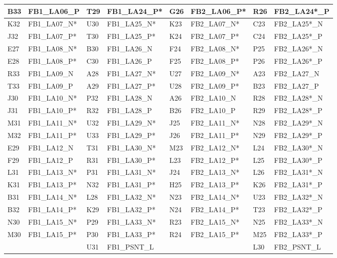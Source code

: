 \documentclass[letterpaper]{article}
\begin{document}
\begin{table}[htp]
\begin{tabular}{|l|l|l|l||l|l|l|l|}
B33 & FB1\_LA06\_P & T29 & FB1\_LA24\_P* & G26 & FB2\_LA06\_P* & R26 & FB2\_LA24*\_P\\ \hline
K32 & FB1\_LA07\_N* & U30 & FB1\_LA25\_N* & K23 & FB2\_LA07\_N* & C23 & FB2\_LA25*\_N\\ \hline
J32 & FB1\_LA07\_P* & T30 & FB1\_LA25\_P* & K24 & FB2\_LA07\_P* & C24 & FB2\_LA25*\_P\\ \hline
E27 & FB1\_LA08\_N* & B30 & FB1\_LA26\_N & F24 & FB2\_LA08\_N* & P25 & FB2\_LA26*\_N\\ \hline
E28 & FB1\_LA08\_P* & C30 & FB1\_LA26\_P & F25 & FB2\_LA08\_P* & P26 & FB2\_LA26*\_P\\ \hline
R33 & FB1\_LA09\_N & A28 & FB1\_LA27\_N* & U27 & FB2\_LA09\_N* & A23 & FB2\_LA27\_N\\ \hline
T33 & FB1\_LA09\_P & A29 & FB1\_LA27\_P* & U28 & FB2\_LA09\_P* & B23 & FB2\_LA27\_P\\ \hline
J30 & FB1\_LA10\_N* & P32 & FB1\_LA28\_N & A26 & FB2\_LA10\_N & R28 & FB2\_LA28*\_N\\ \hline
J31 & FB1\_LA10\_P* & R32 & FB1\_LA28\_P & B26 & FB2\_LA10\_P & R29 & FB2\_LA28*\_P\\ \hline
M31 & FB1\_LA11\_N* & U32 & FB1\_LA29\_N* & J25 & FB2\_LA11\_N* & N28 & FB2\_LA29*\_N\\ \hline
M32 & FB1\_LA11\_P* & U33 & FB1\_LA29\_P* & J26 & FB2\_LA11\_P* & N29 & FB2\_LA29*\_P\\ \hline
E29 & FB1\_LA12\_N & T31 & FB1\_LA30\_N* & M23 & FB2\_LA12\_N* & L24 & FB2\_LA30*\_N\\ \hline
F29 & FB1\_LA12\_P & R31 & FB1\_LA30\_P* & L23 & FB2\_LA12\_P* & L25 & FB2\_LA30*\_P\\ \hline
L31 & FB1\_LA13\_N* & P31 & FB1\_LA31\_N* & J24 & FB2\_LA13\_N* & L26 & FB2\_LA31*\_N\\ \hline
K31 & FB1\_LA13\_P* & N32 & FB1\_LA31\_P* & H25 & FB2\_LA13\_P* & K26 & FB2\_LA31*\_P\\ \hline
B31 & FB1\_LA14\_N* & L28 & FB1\_LA32\_N* & N23 & FB2\_LA14\_N* & U23 & FB2\_LA32*\_N\\ \hline
B32 & FB1\_LA14\_P* & K29 & FB1\_LA32\_P* & N24 & FB2\_LA14\_P* & T23 & FB2\_LA32*\_P\\ \hline
N30 & FB1\_LA15\_N* & P29 & FB1\_LA33\_N* & R23 & FB2\_LA15\_N* & N25 & FB2\_LA33*\_N\\ \hline
M30 & FB1\_LA15\_P* & P30 & FB1\_LA33\_P* & R24 & FB2\_LA15\_P* & M25 & FB2\_LA33*\_P\\ \hline
    &            & U31 & FB1\_PSNT\_L &     &            & L30 & FB2\_PSNT\_L\\ \hline
\end{tabular}
\end{table}
\end{document}
